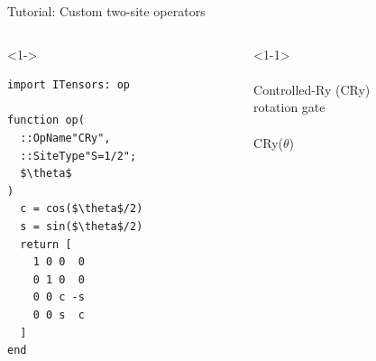 \begin{frame}[fragile]{Tutorial: Custom two-site operators}

\begin{columns}

\begin{column}{5cm}

\begin{onlyenv}<1->

\begin{lstlisting}[language=JuliaLocal, style=julia, mathescape, basicstyle=\scriptsize\ttfamily]
import ITensors: op

function op(
  ::OpName"CRy",
  ::SiteType"S=1/2";
  $\theta$
)
  c = cos($\theta$/2)
  s = sin($\theta$/2)
  return [
    1 0 0  0
    0 1 0  0
    0 0 c -s
    0 0 s  c
  ]
end
\end{lstlisting}

\end{onlyenv}

\end{column}

\begin{column}{5cm}

\begin{onlyenv}<1-1>
~\\
~\\
Controlled-Ry (CRy) \\
rotation gate \\
~\\
CRy($\theta$) \\
~\\
~\\
~\\
~\\
~\\
~\\
~\\
~\\
~\\
~\\
\end{onlyenv}


\end{column}
\end{columns}
\end{frame}
